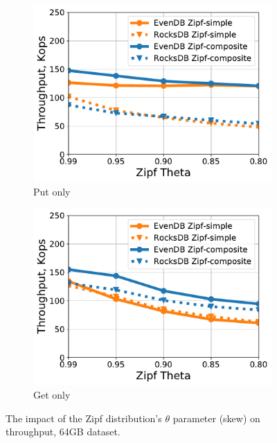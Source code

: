\begin{figure}[t]
	\centering
	\begin{subfigure}{0.48\linewidth}
		\includegraphics[width=\textwidth]{figs/puts_only_skew_line.pdf}
		\caption{Put only}
		\label{fig:puts_only_skew}
	\end{subfigure}
	\begin{subfigure}{0.48\linewidth}
		\includegraphics[width=\textwidth]{figs/gets_only_skew_line.pdf}
		\caption{Get only}
		\label{fig:gets_only_skew}
	\end{subfigure}
	\caption{{The impact of the Zipf distribution's $\theta$ parameter (skew) on throughput, 64GB dataset.}}
	\label{fig:skew_impact}
\end{figure}



